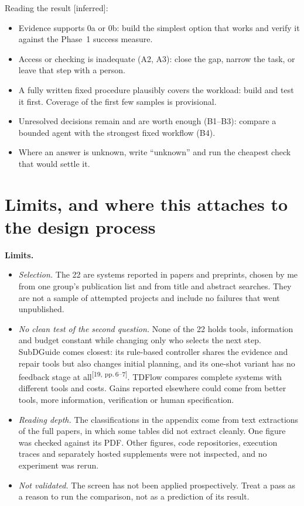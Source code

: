 \documentclass[10pt]{article}
\newcommand{\inferred}{\textsf{\small[inferred]}}
\newcommand{\p}[1]{\textsuperscript{[#1]}}
\begin{document}
Reading the result \inferred:
\begin{itemize}
\item Evidence supports 0a or 0b: build the simplest option that works and verify it against the Phase~1 success measure.
\item Access or checking is inadequate (A2, A3): close the gap, narrow the task, or leave that step with a person.
\item A fully written fixed procedure plausibly covers the workload: build and test it first. Coverage of the first few samples is provisional.
\item Unresolved decisions remain and are worth enough (B1--B3): compare a bounded agent with the strongest fixed workflow (B4).
\item Where an answer is unknown, write ``unknown'' and run the cheapest check that would settle it.
\end{itemize}

\section{Limits, and where this attaches to the design process}\label{sec:limits}

\textbf{Limits.}
\begin{itemize}
\item \emph{Selection.} The 22 are systems reported in papers and preprints, chosen by me from one group's publication list and from title and abstract searches. They are not a sample of attempted projects and include no failures that went unpublished.
\item \emph{No clean test of the second question.} None of the 22 holds tools, information and budget constant while changing only who selects the next step. SubDGuide comes closest: its rule-based controller shares the evidence and repair tools but also changes initial planning, and its one-shot variant has no feedback stage at all\p{19, pp.\,6--7}. TDFlow compares complete systems with different tools and costs. Gains reported elsewhere could come from better tools, more information, verification or human specification.
\item \emph{Reading depth.} The classifications in the appendix come from text extractions of the full papers, in which some tables did not extract cleanly. One figure was checked against its PDF. Other figures, code repositories, execution traces and separately hosted supplements were not inspected, and no experiment was rerun.
\item \emph{Not validated.} The screen has not been applied prospectively. Treat a pass as a reason to run the comparison, not as a prediction of its result.
\end{itemize}
\end{document}
